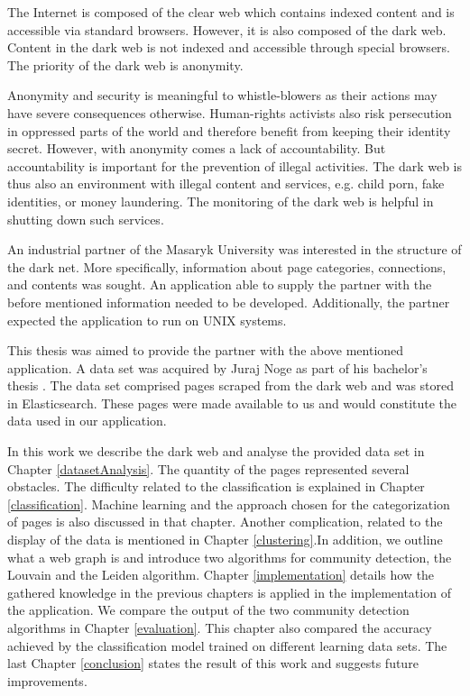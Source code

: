 \label{introduction}
The Internet is composed of the clear web which contains indexed content and is accessible via standard browsers. However, it is also composed of the dark web. Content in the dark web is not indexed and accessible through special browsers. The priority of the dark web is anonymity.

Anonymity and security is meaningful to whistle-blowers as their actions may have severe consequences otherwise. Human-rights activists also risk persecution in oppressed parts of the world and therefore benefit from keeping their identity secret. However, with anonymity comes a lack of accountability. But accountability is important for the prevention of illegal activities. The dark web is thus also an environment with illegal content and services, e.g. child porn, fake identities, or money laundering. The monitoring of the dark web is helpful in shutting down such services.

An industrial partner of the Masaryk University was interested in the structure of the dark net. More specifically, information about page categories, connections, and contents was sought. An application able to supply the partner with the before mentioned information needed to be developed. Additionally, the partner expected the application to run on UNIX systems.

This thesis was aimed to provide the partner with the above mentioned application. A data set was acquired by Juraj Noge as part of his bachelor's thesis \cite{bcScraping}. The data set comprised pages scraped from the dark web and was stored in Elasticsearch. These pages were made available to us and would constitute the data used in our application.

In this work we describe the dark web and analyse the provided data set in Chapter \ref{datasetAnalysis}. The quantity of the pages represented several obstacles. The difficulty related to the classification is explained in Chapter \ref{classification}. Machine learning and the approach chosen for the categorization of pages is also discussed in that chapter. Another complication, related to the display of the data is mentioned in Chapter \ref{clustering}.In addition, we outline what a web graph is and introduce two algorithms for community detection, the Louvain and the Leiden algorithm. Chapter \ref{implementation} details how the gathered knowledge in the previous chapters is applied in the implementation of the application. We compare the output of the two community detection algorithms in Chapter \ref{evaluation}. This chapter also compared the accuracy achieved by the classification model trained on different learning data sets. The last Chapter \ref{conclusion} states the result of this work and suggests future improvements.

